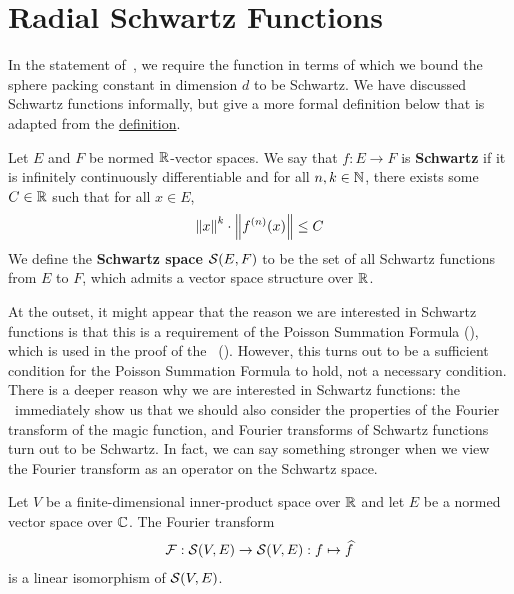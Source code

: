 \section{Radial Schwartz Functions}

In the statement of~, we require the function in terms of which we bound the sphere packing constant in dimension $d$ to be Schwartz. We have discussed Schwartz functions informally, but give a more formal definition below that is adapted from the \href{https://github.com/leanprover-community/mathlib4/blob/bb076f5f2d39b534b917755b0338314b6714304b/Mathlib/Analysis/Distribution/SchwartzSpace.lean#L74-L79}{\mathlib definition}.

\begin{boxdefinition}
    Let $E$ and $F$ be normed $\mathbb{R}$-vector spaces. We say that $f : E \to F$ is \textbf{Schwartz} if it is infinitely continuously differentiable and for all $n, k \in \mathbb{N}$, there exists some $C \in \mathbb{R}$ such that for all $x \in E$,
    \begin{align}
        \left\lVert x \right\rVert^k \cdot \left\lVert f^{(n)}(x) \right\rVert \leq C
        \label{Ch3:Eq:SchwartzDecayProperty}
    \end{align}
    We define the \textbf{Schwartz space} $\mathcal{S}(E, F)$ to be the set of all Schwartz functions from $E$ to $F$, which admits a vector space structure over $\mathbb{R}$.
\end{boxdefinition}

At the outset, it might appear that the reason we are interested in Schwartz functions is that this is a requirement of the Poisson Summation Formula (), which is used in the proof of the \CELP\ (). However, this turns out to be a sufficient condition for the Poisson Summation Formula to hold, not a necessary condition. There is a deeper reason why we are interested in Schwartz functions: the \CEC\ immediately show us that we should also consider the properties of the Fourier transform of the magic function, and Fourier transforms of Schwartz functions turn out to be Schwartz. In fact, we can say something stronger when we view the Fourier transform as an operator on the Schwartz space.

\begin{boxtheorem}\label{Ch3:Thm:FourierSchwartz_CLE}
    Let $V$ be a finite-dimensional inner-product space over $\mathbb{R}$ and let $E$ be a normed vector space over $\mathbb{C}$. The Fourier transform
    \begin{align*}
        \mathcal{F} : \mathcal{S}(V, E) \to \mathcal{S}(V, E) : f \mapsto \widehat{f}
    \end{align*}
    is a linear isomorphism of $\mathcal{S}(V, E)$. %
\end{boxtheorem}

